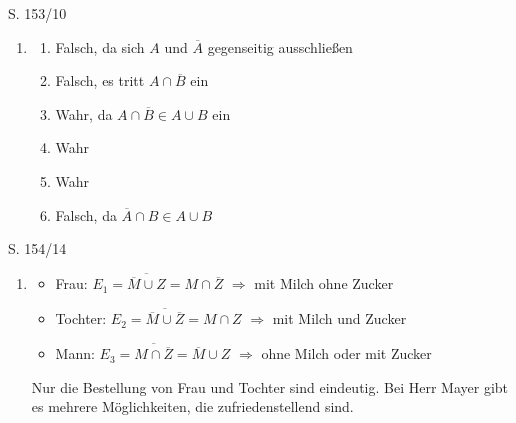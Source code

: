 \begin{Exercise}{S. 153/10}{}
\begin{enumerate}[leftmargin=*]
    \item [10.]\begin{enumerate}[label=\alph*),leftmargin=*]
        \item[a)] {
            Falsch, da sich $A$ und $\overline{A}$ gegenseitig ausschließen
            }
        \item[b)] {
            Falsch, es tritt $A \cap \overline{B}$ ein
            }
        \item[c)] {
            Wahr, da $A \cap \overline{B} \in A \cup B$ ein
            }
        \item[d)] {
            Wahr
            }
        \item[e)] {
            Wahr
            }
        \item[f)] {
            Falsch, da $\overline{A} \cap B \in A \cup B$
            }
    \end{enumerate}
\end{enumerate}
\end{Exercise}

\begin{Exercise}{S. 154/14}{}
\begin{enumerate}[leftmargin=*]
    \item [14.]{\begin{itemize}[leftmargin=*]
        \item {Frau: \qquad $E_{1} = \overline{\overline{M} \cup Z} = M \cap \overline{Z}$ \qquad $\Rightarrow$ \quad mit Milch ohne Zucker}\\[-1.5ex]
        \item {Tochter: \qquad $E_{2} = \overline{\overline{M} \cup \overline{Z}} = M \cap Z$ \qquad $\Rightarrow$ \quad mit Milch und Zucker}\\[-1.5ex]
        \item {Mann: \qquad $E_{3} = \overline{M \cap \overline{Z}} = \overline{M} \cup Z$ \qquad $\Rightarrow$ \quad ohne Milch oder mit Zucker}\\[-1.5ex]
        \end{itemize}
        Nur die Bestellung von Frau und Tochter sind eindeutig. Bei Herr Mayer gibt es mehrere Möglichkeiten, die zufriedenstellend sind.
        }
\end{enumerate}
\end{Exercise}


